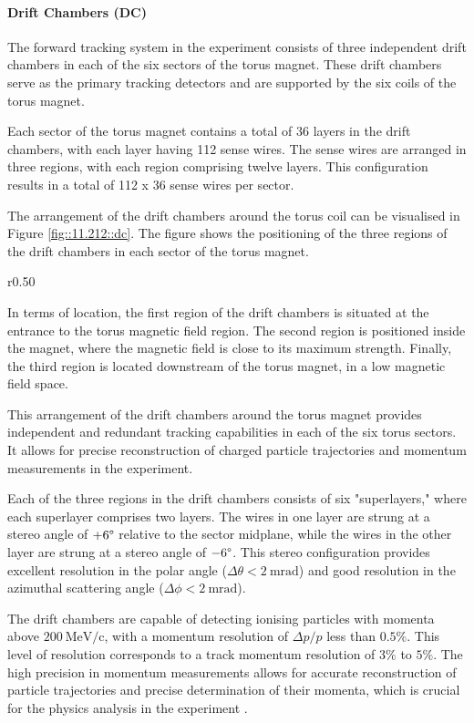 \paragraph{Drift Chambers (DC)}
    The forward tracking system in the experiment consists of three independent drift chambers in each of the six sectors of the torus magnet.
    These drift chambers serve as the primary tracking detectors and are supported by the six coils of the torus magnet.

    Each sector of the torus magnet contains a total of 36 layers in the drift chambers, with each layer having 112 sense wires.
    The sense wires are arranged in three regions, with each region comprising twelve layers.
    This configuration results in a total of 112 x 36 sense wires per sector.

    The arrangement of the drift chambers around the torus coil can be visualised in Figure \ref{fig::11.212::dc}.
    The figure shows the positioning of the three regions of the drift chambers in each sector of the torus magnet.

    \begin{wrapfigure}{r}{0.50\textwidth}
        \centering{}
        \caption[DC]{Drift Chambers render.
        Each of the DC regions are denoted as R1, R2, and R3 in the figure.
        Source: \href{https://jlab.org/physics/hall-b/clas12}{CLAS12 wiki}.}
        \label{fig::11.212::dc}
    \end{wrapfigure}

    In terms of location, the first region of the drift chambers is situated at the entrance to the torus magnetic field region.
    The second region is positioned inside the magnet, where the magnetic field is close to its maximum strength.
    Finally, the third region is located downstream of the torus magnet, in a low magnetic field space.

    This arrangement of the drift chambers around the torus magnet provides independent and redundant tracking capabilities in each of the six torus sectors.
    It allows for precise reconstruction of charged particle trajectories and momentum measurements in the experiment.

    Each of the three regions in the drift chambers consists of six "superlayers," where each superlayer comprises two layers.
    The wires in one layer are strung at a stereo angle of $+6\degree$ relative to the sector midplane, while the wires in the other layer are strung at a stereo angle of $-6\degree$.
    This stereo configuration provides excellent resolution in the polar angle ($\Delta\theta < 2 ~\text{mrad}$) and good resolution in the azimuthal scattering angle ($\Delta\phi < 2 ~\text{mrad}$).

    The drift chambers are capable of detecting ionising particles with momenta above $200 ~\text{MeV}/\text{c}$, with a momentum resolution of $\Delta p/p$ less than $0.5\%$. This level of resolution corresponds to a track momentum resolution of $3\%$ to $5\%$.
    The high precision in momentum measurements allows for accurate reconstruction of particle trajectories and precise determination of their momenta, which is crucial for the physics analysis in the experiment \cite{mestayer2020}.
